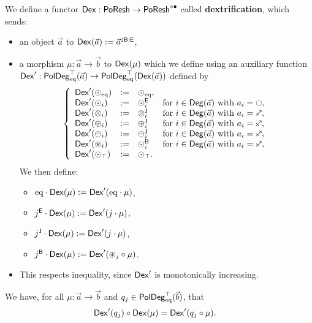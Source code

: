 \documentclass[a4paper]{memoir}
\begin{document}
\begin{definition} \label{def:poresh-dex}
	We define a functor ${\mathsf{Dex}} : \mathsf{PoResh} \to \mathsf{PoResh}^{\circ \bullet}$ called \textbf{dextrification}, which sends:
	\begin{itemize}
		\item an object $\vec a$ to ${\mathsf{Dex}}(\vec a) := \vec a^{\mathsf{JB};\mathsf{E}}$,
		\item a morphism $\mu : \vec a \to \vec b$ to ${\mathsf{Dex}}(\mu)$ which we define using an auxiliary function ${\mathsf{Dex}}' : \mathsf{PolDeg}_{\mathrm{eq}}^\top(\vec a) \to \mathsf{PolDeg}_{\mathrm{eq}}^\top({\mathsf{Dex}}(\vec a))$ defined by
		\[
			\left\{ \begin{array}{l l l l}
				\Dex'(\nonpol_\eqtydeg) &:=& \nonpol_\eqtydeg, \\
				\Dex'(\nonpol_i) &:=& \nwnonpol_i &\text{for $i \in \Deg(\vec a)$ with $a_i = \npolar$}, \\
				\Dex'(\mixpol_i) &:=& \nwmixpol_i &\text{for $i \in \Deg(\vec a)$ with $a_i = \ypolar$}, \\
				\Dex'(\pospol_i) &:=& \nwpospol_i &\text{for $i \in \Deg(\vec a)$ with $a_i = \ypolar$}, \\
				\Dex'(\negpol_i) &:=& \nwnegpol_i &\text{for $i \in \Deg(\vec a)$ with $a_i = \ypolar$}, \\
				\Dex'(\isopol_i) &:=& \nwbridgepol_i &\text{for $i \in \Deg(\vec a)$ with $a_i = \ypolar$}, \\
				\Dex'(\nonpol_\top) &:=& \nonpol_\top. \\
			\end{array} \right.
		\]
		We then define:
		\begin{itemize}
			\item ${\mathrm{eq}} \cdot {\mathsf{Dex}}(\mu) := {\mathsf{Dex}}'({\mathrm{eq}} \cdot \mu)$,
			\item ${j}^{\mathsf{E}} \cdot {\mathsf{Dex}}(\mu) := {\mathsf{Dex}}'(j \cdot \mu)$,
			\item ${j}^{\mathsf{J}} \cdot {\mathsf{Dex}}(\mu) := {\mathsf{Dex}}'(j \cdot \mu)$,
			\item ${j}^{\mathsf{B}} \cdot {\mathsf{Dex}}(\mu) := {\mathsf{Dex}}'({\oast}_j \circ \mu)$.
		\end{itemize}
		\item This respects inequality, since ${\mathsf{Dex}}'$ is monotonically increasing.
	\end{itemize}
\end{definition}
\begin{corollary} \label{thm:poresh-dex-char}
	We have, for all $\mu : \vec a \to \vec b$ and $q_j \in \mathsf{PolDeg}_{\mathrm{eq}}^\top(\vec b)$, that
	\begin{align*}
		{\mathsf{Dex}}'(q_j) \circ {\mathsf{Dex}}(\mu) &= {\mathsf{Dex}}'(q_j \circ \mu).
	\end{align*}
\end{corollary}
\end{document}
